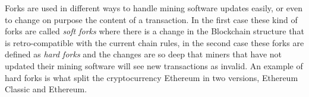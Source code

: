 Forks are used in different ways to handle mining software updates easily, or
even to change on purpose the content of a transaction\cite{sok15}. In the
first case these kind of forks are called \textit{soft forks} where there is a
change in the Blockchain structure that is retro-compatible with the current
chain rules, in the second case these forks are defined as \textit{hard forks}
and the changes are so deep that miners that have not updated their mining
software will see new transactions as invalid. An example of hard forks is what
split the cryptocurrency Ethereum in two versions, Ethereum Classic and
Ethereum.
